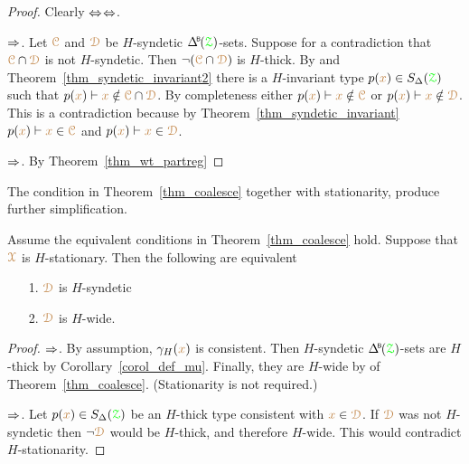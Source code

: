 \begin{proof}
  Clearly $\Leftrightarrow$$\Leftrightarrow$.

  $\Rightarrow$.
  Let ${\color{brown}\EuScript C}$ and ${\color{brown}\EuScript D}$ be $H$-syndetic $\BDelta({\grZ})$-sets.
  Suppose for a contradiction that ${\color{brown}\EuScript C}\cap{\color{brown}\EuScript D}$ is not $H$-syndetic.
  Then $\neg({\color{brown}\EuScript C}\cap{\color{brown}\EuScript D})$ is $H$-thick.
  By  and Theorem~\ref{thm_syndetic_invariant2} there is a $H$-invariant type $p({\color{brown} x})\in S_\Delta({\color{green}\EuScript Z})$ such that $p({\color{brown} x})\vdash{\color{brown}x}\notin{\color{brown}\EuScript C}\cap{\color{brown}\EuScript D}$.
  By completeness either $p({\color{brown} x})\vdash{\color{brown}x}\notin{\color{brown}\EuScript C}$ or $p({\color{brown} x})\vdash{\color{brown}x}\notin{\color{brown}\EuScript D}$.
  This is a contradiction because by Theorem~\ref{thm_syndetic_invariant} $p({\color{brown} x})\vdash{\color{brown}x}\in{\color{brown}\EuScript C}$ and $p({\color{brown} x})\vdash{\color{brown}x}\in{\color{brown}\EuScript D}$.


  $\Rightarrow$. By Theorem~\ref{thm_wt_partreg}
\end{proof}

The condition in Theorem~\ref{thm_coalesce} together with stationarity, produce further simplification.

\begin{fact}
  Assume the equivalent conditions in Theorem~\ref{thm_coalesce} hold. 
  Suppose that ${\color{brown}\EuScript X}$ is $H$-stationary.
  Then the following are equivalent
  \begin{itemize}
    \item [1.] ${\color{brown}\EuScript D}$ is $H$-syndetic
    \item [2.] ${\color{brown}\EuScript D}$ is $H$-wide.
  \end{itemize}
\end{fact}

\begin{proof}
  $\Rightarrow$.
  By assumption, $\gamma_H({\color{brown} x})$ is consistent.
  Then $H$-syndetic $\BDelta({\grZ})$-sets are $H$-thick by Corollary~\ref{corol_def_mu}.
  Finally, they are  $H$-wide by  of Theorem~\ref{thm_coalesce}.
  (Stationarity is not required.)

  $\Rightarrow$.
  Let $p({\color{brown} x})\in S_\Delta({\color{green}\EuScript Z})$ be an $H$-thick type consistent with ${\color{brown} x}\in{\color{brown}\EuScript D}$.
  If ${\color{brown}\EuScript D}$ was not $H$-syndetic then $\neg{\color{brown}\EuScript D}$ would be $H$-thick, and therefore $H$-wide.
  This would contradict $H$-stationarity.
\end{proof}

